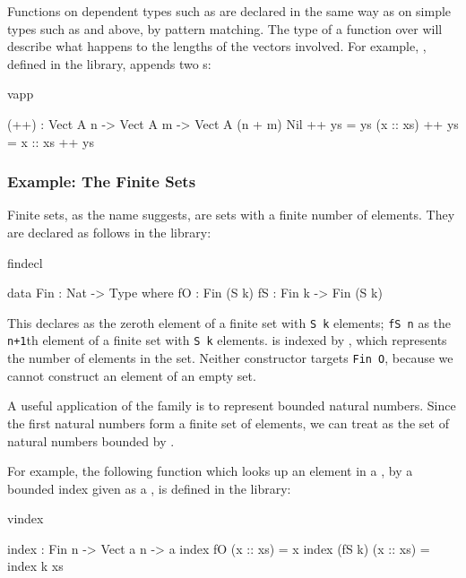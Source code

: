 Functions on dependent types such as  are declared in the same way
as on simple types such as  and  above, by pattern matching.
The type of a function over  will describe what happens to the
lengths of the vectors involved. For example, \tFN{++}, defined in the
library, appends two s:

\begin{SaveVerbatim}{vapp}

(++) : Vect A n -> Vect A m -> Vect A (n + m)
Nil       ++ ys = ys
(x :: xs) ++ ys = x :: xs ++ ys

\end{SaveVerbatim}

\subsubsection*{Example: The Finite Sets}

Finite sets, as the name suggests, are sets with a finite number of elements.
They are declared as follows in the library:

\begin{SaveVerbatim}{findecl}

data Fin : Nat -> Type where
   fO : Fin (S k)
   fS : Fin k -> Fin (S k)

\end{SaveVerbatim}

\noindent
This declares
 as the zeroth element of a finite set with \texttt{S k} elements; 
\texttt{fS n} as the
\texttt{n+1}th element of a finite set with \texttt{S k} elements. 
 is indexed by , which
represents the number of elements in the set. 
Neither constructor targets \texttt{Fin O}, because we cannot construct an
element of an empty set.

A useful application of the  family is to represent bounded
natural numbers. Since the first  natural numbers form a finite
set of  elements, we can treat  as the set of natural
numbers bounded by . 

For example, the following function which looks up an element in a ,
by a bounded index given as a , is defined in the library:

\begin{SaveVerbatim}{vindex}

index : Fin n -> Vect a n -> a
index fO     (x :: xs) = x
index (fS k) (x :: xs) = index k xs

\end{SaveVerbatim}

